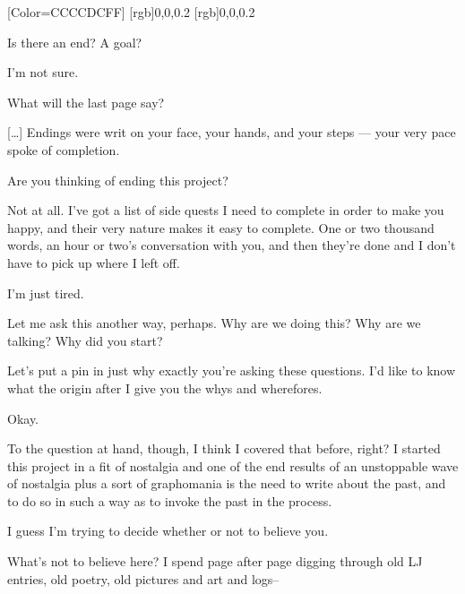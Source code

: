 \renewfontfamily{}[Color=CCCCDCFF]
[rgb]{0,0,0.2}
[rgb]{0,0,0.2}
\begin{paracol}{2}
  \begin{rightcolumn*}
    
  \end{rightcolumn*}
  \begin{leftcolumn}

\begin{ally}
Is there an end? A goal?
\end{ally}
I'm not sure.

\begin{ally}
What will the last page say?
\end{ally}
{[}\ldots{}{]} Endings were writ on your face, your hands, and your steps --- your very pace spoke of completion.

\begin{ally}
Are you thinking of ending this project?
\end{ally}
Not at all. I've got a list of side quests I need to complete in order to make you happy, and their very nature makes it easy to complete. One or two thousand words, an hour or two's conversation with you, and then they're done and I don't have to pick up where I left off.

I'm just tired.

\label{ally:20}

\begin{ally}
Let me ask this another way, perhaps. Why are we doing this? Why are we talking? Why did you start?
\end{ally}
Let's put a pin in just why exactly you're asking these questions. I'd like to know what the origin after I give you the whys and wherefores.

\begin{ally}
Okay.
\end{ally}
To the question at hand, though, I think I covered that before, right? I started this project in a fit of nostalgia and one of the end results of an unstoppable wave of nostalgia plus a sort of graphomania is the need to write about the past, and to do so in such a way as to invoke the past in the process.

\begin{ally}
I guess I'm trying to decide whether or not to believe you.
\end{ally}
What's not to believe here? I spend page after page digging through old LJ entries, old poetry, old pictures and art and logs--


\end{leftcolumn}
\end{paracol}
